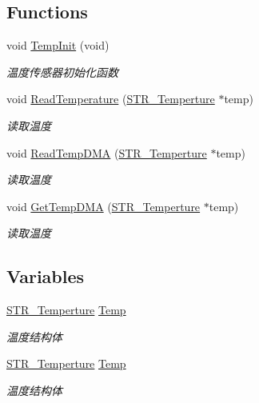 \subsection*{\-Functions}
\begin{DoxyCompactItemize}
\item 
void \hyperlink{group___t_e_m_p_ga57159917434e76ddd7c731318a358dd6}{\-Temp\-Init} (void)
\begin{DoxyCompactList}\small\item\em 温度传感器初始化函数 \end{DoxyCompactList}\item 
void \hyperlink{group___t_e_m_p_gab76473fe3a17b767072178901b184618}{\-Read\-Temperature} (\hyperlink{struct_s_t_r___temperture}{\-S\-T\-R\-\_\-\-Temperture} $\ast$temp)
\begin{DoxyCompactList}\small\item\em 读取温度 \end{DoxyCompactList}\item 
void \hyperlink{group___t_e_m_p_ga4a656ecef26ec3aa858327776b49d7d2}{\-Read\-Temp\-D\-M\-A} (\hyperlink{struct_s_t_r___temperture}{\-S\-T\-R\-\_\-\-Temperture} $\ast$temp)
\begin{DoxyCompactList}\small\item\em 读取温度 \end{DoxyCompactList}\item 
void \hyperlink{group___t_e_m_p_ga338e9bad1febde8db4ce214d47aff717}{\-Get\-Temp\-D\-M\-A} (\hyperlink{struct_s_t_r___temperture}{\-S\-T\-R\-\_\-\-Temperture} $\ast$temp)
\begin{DoxyCompactList}\small\item\em 读取温度 \end{DoxyCompactList}\end{DoxyCompactItemize}
\subsection*{\-Variables}
\begin{DoxyCompactItemize}
\item 
\hypertarget{group___t_e_m_p_ga8237918ba9ee854c74fa0ec6655eb9a6}{\hyperlink{struct_s_t_r___temperture}{\-S\-T\-R\-\_\-\-Temperture} \hyperlink{group___t_e_m_p_ga8237918ba9ee854c74fa0ec6655eb9a6}{\-Temp}}\label{group___t_e_m_p_ga8237918ba9ee854c74fa0ec6655eb9a6}

\begin{DoxyCompactList}\small\item\em 温度结构体 \end{DoxyCompactList}\item 
\hypertarget{group___t_e_m_p_ga8237918ba9ee854c74fa0ec6655eb9a6}{\hyperlink{struct_s_t_r___temperture}{\-S\-T\-R\-\_\-\-Temperture} \hyperlink{group___t_e_m_p_ga8237918ba9ee854c74fa0ec6655eb9a6}{\-Temp}}\label{group___t_e_m_p_ga8237918ba9ee854c74fa0ec6655eb9a6}

\begin{DoxyCompactList}\small\item\em 温度结构体 \end{DoxyCompactList}\end{DoxyCompactItemize}


